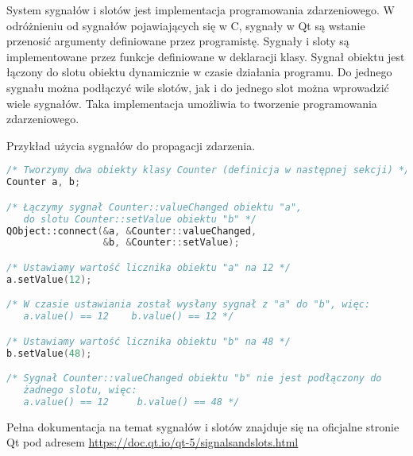
\par
System sygnałów i slotów jest implementacja programowania zdarzeniowego.
W odróżnieniu od sygnałów pojawiających się w C, sygnały w Qt są wstanie przenosić argumenty definiowane przez programistę.
Sygnały i sloty są implementowane przez funkcje definiowane w deklaracji klasy.
Sygnał obiektu jest łączony do slotu obiektu dynamicznie w czasie działania programu.
Do jednego sygnału można podłączyć wile slotów, jak i do jednego slot można wprowadzić wiele sygnałów.
Taka implementacja umożliwia to tworzenie programowania zdarzeniowego.

\par
Przykład użycia sygnałów do propagacji zdarzenia.

\begin{lstlisting}[language=C++]
/* Tworzymy dwa obiekty klasy Counter (definicja w następnej sekcji) */
Counter a, b;

/* Łączymy sygnał Counter::valueChanged obiektu "a",
   do slotu Counter::setValue obiektu "b" */
QObject::connect(&a, &Counter::valueChanged,
                 &b, &Counter::setValue);

/* Ustawiamy wartość licznika obiektu "a" na 12 */
a.setValue(12);

/* W czasie ustawiania został wysłany sygnał z "a" do "b", więc:
   a.value() == 12    b.value() == 12 */

/* Ustawiamy wartość licznika obiektu "b" na 48 */
b.setValue(48);

/* Sygnał Counter::valueChanged obiektu "b" nie jest podłączony do
   żadnego slotu, więc:
   a.value() == 12     b.value() == 48 */

\end{lstlisting}

\par
Pełna dokumentacja na temat sygnałów i slotów znajduje się na oficjalne stronie Qt pod adresem \url{https://doc.qt.io/qt-5/signalsandslots.html}